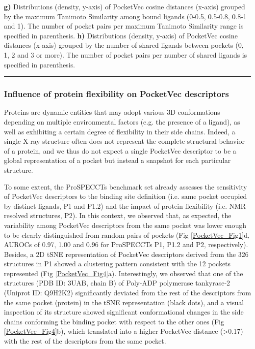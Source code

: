 \begin{Figure_modified}
{    \textbf{g)} Distributions (density, y-axis) of PocketVec cosine distances (x-axis) grouped by the maximum Tanimoto Similarity among bound ligands (0-0.5, 0.5-0.8, 0.8-1 and 1). The number of pocket pairs per maximum Tanimoto Similarity range is specified in parenthesis.
    \textbf{h)} Distributions (density, y-axis) of PocketVec cosine distances (x-axis) grouped by the number of shared ligands between pockets (0, 1, 2 and 3 or more). The number of pocket pairs per number of shared ligands is specified in parenthesis.
  }
  \vspace{-5mm}
  \rule[0ex]{\textwidth}{0.5pt}
  \vspace{-9mm}
  \label{PocketVec_Fig3}
\end{Figure_modified}




\subsubsection{Influence of protein flexibility on PocketVec descriptors}
\label{PocketVec_ResultsAndDiscussion_Influence_of_protein_flexibility}

Proteins are dynamic entities that may adopt various 3D conformations depending on multiple environmental factors (e.g. the presence of a ligand), as well as exhibiting a certain degree of flexibility in their side chains. Indeed, a single X-ray structure often does not represent the complete structural behavior of a protein, and we thus do not expect a single PocketVec descriptor to be a global representation of a pocket but instead a snapshot for each particular structure. 

To some extent, the ProSPECCTs benchmark set already assesses the sensitivity of PocketVec descriptors to the binding site definition (i.e. same pocket occupied by distinct ligands, P1 and P1.2) and the impact of protein flexibility (i.e. NMR-resolved structures, P2). In this context, we observed that, as expected, the variability among PocketVec descriptors from the same pocket was lower enough to be clearly distinguished from random pairs of pockets (Fig \ref{PocketVec_Fig1}d, AUROCs of 0.97, 1.00 and 0.96 for ProSPECCTs P1, P1.2 and P2, respectively). Besides, a 2D tSNE representation of PocketVec descriptors derived from the 326 structures in P1 showed a clustering pattern consistent with the 12 pockets represented (Fig \ref{PocketVec_Fig4}a). Interestingly, we observed that one of the structures (PDB ID: 3UAB, chain B) of Poly-ADP polymerase tankyrase-2 (Uniprot ID: Q9H2K2) significantly deviated from the rest of the descriptors from the same pocket (protein) in the tSNE representation (black dots), and a visual inspection of its structure showed significant conformational changes in the side chains conforming the binding pocket with respect to the other ones (Fig \ref{PocketVec_Fig4}b), which translated into a higher PocketVec distance (>0.17) with the rest of the descriptors from the same pocket. 

